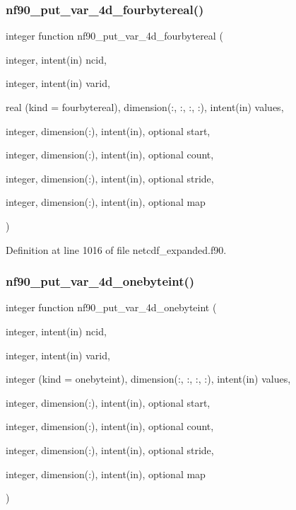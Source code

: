 \subsubsection{\texorpdfstring{nf90\+\_\+put\+\_\+var\+\_\+4d\+\_\+fourbytereal()}{nf90\_put\_var\_4d\_fourbytereal()}}
{\footnotesize\ttfamily integer function nf90\+\_\+put\+\_\+var\+\_\+4d\+\_\+fourbytereal (\begin{DoxyParamCaption}\item[{integer, intent(in)}]{ncid,  }\item[{integer, intent(in)}]{varid,  }\item[{real (kind = fourbytereal), dimension(\+:, \+:, \+:, \+:), intent(in)}]{values,  }\item[{integer, dimension(\+:), intent(in), optional}]{start,  }\item[{integer, dimension(\+:), intent(in), optional}]{count,  }\item[{integer, dimension(\+:), intent(in), optional}]{stride,  }\item[{integer, dimension(\+:), intent(in), optional}]{map }\end{DoxyParamCaption})}



Definition at line 1016 of file netcdf\+\_\+expanded.\+f90.

\mbox{\label{netcdf__expanded_8f90_a87a4a103fcdd36b01a07268529c70dc8}} 
\subsubsection{\texorpdfstring{nf90\+\_\+put\+\_\+var\+\_\+4d\+\_\+onebyteint()}{nf90\_put\_var\_4d\_onebyteint()}}
{\footnotesize\ttfamily integer function nf90\+\_\+put\+\_\+var\+\_\+4d\+\_\+onebyteint (\begin{DoxyParamCaption}\item[{integer, intent(in)}]{ncid,  }\item[{integer, intent(in)}]{varid,  }\item[{integer (kind = onebyteint), dimension(\+:, \+:, \+:, \+:), intent(in)}]{values,  }\item[{integer, dimension(\+:), intent(in), optional}]{start,  }\item[{integer, dimension(\+:), intent(in), optional}]{count,  }\item[{integer, dimension(\+:), intent(in), optional}]{stride,  }\item[{integer, dimension(\+:), intent(in), optional}]{map }\end{DoxyParamCaption})}



